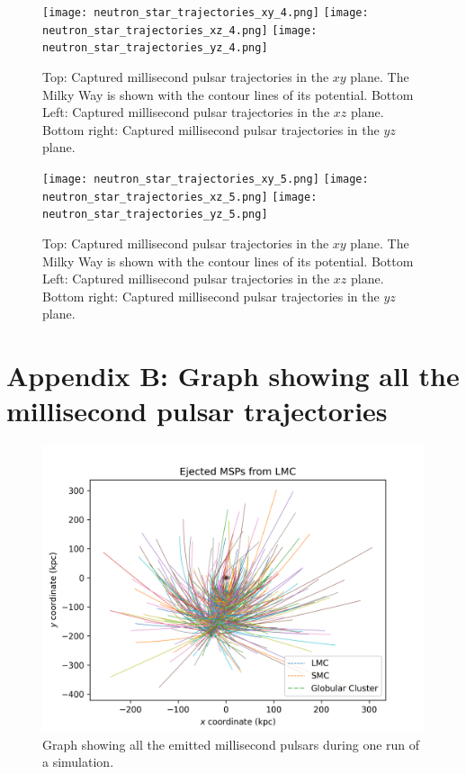 \begin{figure}[H]
\centering
\texttt{[image: neutron\_star\_trajectories\_xy\_4.png]}
\texttt{[image: neutron\_star\_trajectories\_xz\_4.png]}
\texttt{[image: neutron\_star\_trajectories\_yz\_4.png]}
\caption{Top: Captured millisecond pulsar trajectories in the $xy$ plane. The Milky Way is shown with the contour lines of its potential. Bottom Left: Captured millisecond pulsar trajectories in the $xz$ plane. Bottom right: Captured millisecond pulsar trajectories in the $yz$ plane.}
\label{Simulation4}
\end{figure}

\begin{figure}[H]
\centering
\texttt{[image: neutron\_star\_trajectories\_xy\_5.png]}
\texttt{[image: neutron\_star\_trajectories\_xz\_5.png]}
\texttt{[image: neutron\_star\_trajectories\_yz\_5.png]}
\caption{Top: Captured millisecond pulsar trajectories in the $xy$ plane. The Milky Way is shown with the contour lines of its potential. Bottom Left: Captured millisecond pulsar trajectories in the $xz$ plane. Bottom right: Captured millisecond pulsar trajectories in the $yz$ plane.}
\label{Simulation5}
\end{figure}

\newpage
\section*{Appendix B: Graph showing all the millisecond pulsar trajectories}\label{AppA}
\renewcommand{\thefigure}{B.\arabic{figure}}
\setcounter{figure}{0}


\begin{figure}[H]
\centering
\includegraphics[width=1\textwidth]{AllNeutronStarsEmitted.png}
\caption{Graph showing all the emitted millisecond pulsars during one run of a simulation.}
\label{Simulation6}
\end{figure}

